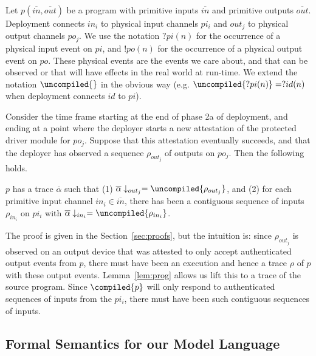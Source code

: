 %
Let $p(\overline{in},\overline{out})$ be a program with primitive inputs $\overline{in}$ and primitive outputs $\overline{out}$. 
Deployment connects $in_i$ to physical
input channels $pi_i$ and
$out_j$ to physical output channels $po_j$. 
%
We use the notation $?pi(n)$ for the occurrence of a physical input event on $pi$, and $!po(n)$ for the
occurrence of a physical output event on $po$. These physical events are
the events we care about, and that can be observed or that will have effects in the
real world at run-time. We extend the notation $\uncompiled{ }$  in the obvious way (e.g. $\uncompiled{?pi(n)} = ?id(n)$ when deployment connects $id$ to $pi$).

Consider the time frame starting at the end of phase 2a of deployment, and ending at a point where the deployer starts a new attestation of the protected driver module
for $po_j$. Suppose that  this attestation eventually succeeds, and that the deployer has observed a sequence $\rho_{out_j}$ of outputs on $po_j$. Then the following holds.
% 
\begin{theorem}
$p$ has a trace $\overline{\alpha}$ such that (1) $\overline{\alpha}\downarrow_{out_j} = \uncompiled{\rho_{out_j}}$,
and (2) for each primitive input channel $in_i \in \overline{in}$, there has been a contiguous sequence of inputs $\rho_{in_i}$ on $pi_i$ with  $\overline{\alpha}\downarrow_{in_i} = \uncompiled{\rho_{in_i}}$.
\end{theorem}
% 
The proof is given in the Section~\ref{sec:proofs}, but the intuition is: since $\rho_{out_j}$ is observed on an output device that was attested to only accept authenticated output events from $p$,
there must have been an execution and hence a trace $\rho$ of $p$ with
these output events. Lemma~\ref{lem:prog} allows us lift this to a trace of the source program.
Since $\compiled{p}$ will only respond to authenticated sequences of inputs from the $pi_i$, there must have been such contiguous sequences of inputs.


\subsection{Formal Semantics for our Model Language}
\label{sec:semantics}


